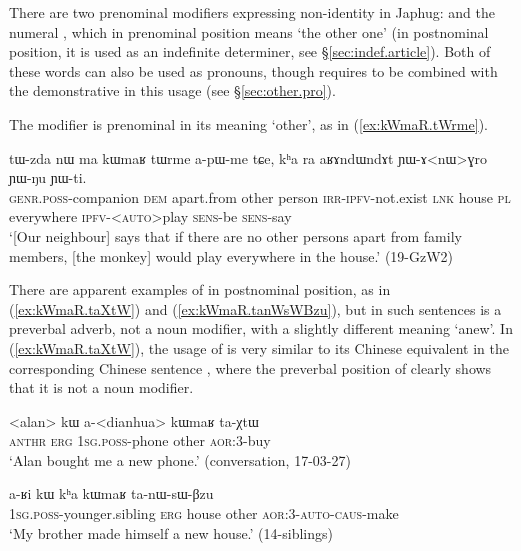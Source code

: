 There are two prenominal modifiers expressing non-identity in Japhug:  and the numeral , which in prenominal position means `the other one' (in postnominal position, it is used as an indefinite determiner, see §\ref{sec:indef.article}). Both of these words can also be used as pronouns, though  requires to be combined with the demonstrative  in this usage (see §\ref{sec:other.pro}).

The modifier  is prenominal in its meaning `other', as in (\ref{ex:kWmaR.tWrme}). 

\begin{exe}
\ex \label{ex:kWmaR.tWrme}
\gll tɯ-zda nɯ ma kɯmaʁ tɯrme a-pɯ-me tɕe, kʰa ra aʁɤndɯndɤt ɲɯ-ɤ<nɯ>ɣro ɲɯ-ŋu ɲɯ-ti. \\
\textsc{genr}.\textsc{poss}-companion \textsc{dem} apart.from other person \textsc{irr}-\textsc{ipfv}-not.exist \textsc{lnk} house \textsc{pl} everywhere \textsc{ipfv}-<\textsc{auto}>play \textsc{sens}-be \textsc{sens}-say \\
\glt `[Our neighbour] says that if there are no other persons apart from family members, [the monkey] would play everywhere in the house.' (19-GzW2)
\end{exe}

There are apparent examples of  in postnominal position, as in (\ref{ex:kWmaR.taXtW}) and (\ref{ex:kWmaR.tanWsWBzu}), but in such sentences  is a preverbal adverb, not a noun modifier, with a slightly different meaning `anew'. In (\ref{ex:kWmaR.taXtW}), the usage of  is very similar to its Chinese equivalent  in the corresponding Chinese sentence , where the preverbal position of  clearly shows that it is not a noun modifier. 

\begin{exe}
\ex \label{ex:kWmaR.taXtW}
\gll <alan> kɯ a-<dianhua> kɯmaʁ ta-χtɯ \\
\textsc{anthr} \textsc{erg} \textsc{1sg}.\textsc{poss}-phone other \textsc{aor}:3\flobv{}-buy \\
\glt `Alan bought me a new phone.' (conversation, 17-03-27)
\end{exe}

\begin{exe}
\ex \label{ex:kWmaR.tanWsWBzu}
\gll a-ʁi kɯ kʰa kɯmaʁ ta-nɯ-sɯ-βzu\\
\textsc{1sg}.\textsc{poss}-younger.sibling \textsc{erg} house other \textsc{aor}:3\flobv{}-\textsc{auto}-\textsc{caus}-make\\
\glt `My brother made himself a new house.' (14-siblings)
\end{exe}

